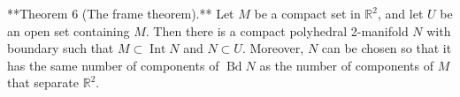 **Theorem 6 (The frame theorem).** Let $M$ be a compact set in $\mathbb{R}^2$, and let $U$ be an open set containing $M$. Then there is a compact polyhedral 2-manifold $N$ with boundary such that $M \subset \operatorname{Int} N$ and $N \subset U$. Moreover, $N$ can be chosen so that it has the same number of components of $\operatorname{Bd} N$ as the number of components of $M$ that separate $\mathbb{R}^2$.
